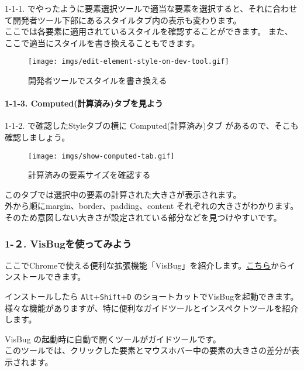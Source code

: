 1-1-1.
でやったように要素選択ツールで適当な要素を選択すると、それに合わせて開発者ツール下部にあるスタイルタブ内の表示も変わります。\\
ここでは各要素に適用されているスタイルを確認することができます。
また、ここで適当にスタイルを書き換えることもできます。

\begin{figure}
\centering
\texttt{[image: imgs/edit-element-style-on-dev-tool.gif]}
\caption{開発者ツールでスタイルを書き換える}
\end{figure}

\paragraph{1-1-3.
Computed(計算済み)タブを見よう}\label{computedux8a08ux7b97ux6e08ux307fux30bfux30d6ux3092ux898bux3088ux3046}

1-1-2. で確認したStyleタブの横に Computed(計算済み)タブ
があるので、そこも確認しましょう。

\begin{figure}
\centering
\texttt{[image: imgs/show-conputed-tab.gif]}
\caption{計算済みの要素サイズを確認する}
\end{figure}

このタブでは選択中の要素の計算された大きさが表示されます。\\
外から順にmargin、border、padding、content
それぞれの大きさがわかります。\\
そのため意図しない大きさが設定されている部分などを見つけやすいです。

\subsubsection{1-２.
VisBugを使ってみよう}\label{visbugux3092ux4f7fux3063ux3066ux307fux3088ux3046}

ここでChromeで使える便利な拡張機能「VisBug」を紹介します。\href{https://chrome.google.com/webstore/detail/visbug/cdockenadnadldjbbgcallicgledbeoc?hl=ja}{こちら}からインストールできます。

インストールしたら \texttt{Alt}+\texttt{Shift}+\texttt{D}
のショートカットでVisBugを起動できます。\\
様々な機能がありますが、特に便利なガイドツールとインスペクトツールを紹介します。

VisBug の起動時に自動で開くツールがガイドツールです。\\
このツールでは、クリックした要素とマウスホバー中の要素の大きさの差分が表示されます。

